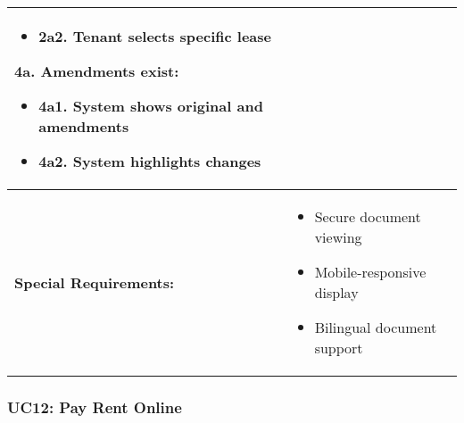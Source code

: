 \documentclass[12pt]{article}
\begin{document}
\begin{tabular}{|p{3cm}|p{11cm}|}
\begin{itemize}
    \item 2a2. Tenant selects specific lease
\end{itemize}
\textbf{4a. Amendments exist:}
\begin{itemize}
    \item 4a1. System shows original and amendments
    \item 4a2. System highlights changes
\end{itemize} \\
\hline
\textbf{Special Requirements:} & 
\begin{itemize}
    \item Secure document viewing
    \item Mobile-responsive display
    \item Bilingual document support
\end{itemize} \\
\hline
\end{tabular}

\subsubsection{UC12: Pay Rent Online}
\end{document}
